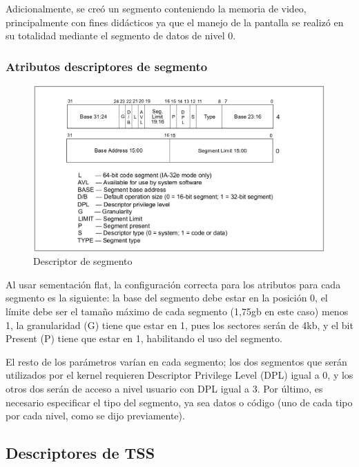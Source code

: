 	Adicionalmente, se creó un segmento conteniendo la memoria de video, principalmente con 
fines didácticos ya que el manejo de la pantalla se realizó en su totalidad mediante el segmento de datos de nivel 0.

\subsubsection{Atributos descriptores de segmento}


\begin{figure}[h]
\begin{center}
  \includegraphics[scale=0.3]{secciones/dibujitos/descriptorDeSegmento.png}
\end{center}
\caption{Descriptor de segmento}
\label{fig:descriptorDeSegmento}
\end{figure}

	
	Al usar sementación flat, la configuración correcta para los atributos para cada segmento es la 
siguiente: la base del segmento debe estar en la posición 0, el límite debe ser el tamaño máximo 
de cada segmento (1,75gb en este caso) menos 1, la granularidad (G) tiene que estar en 1, pues los sectores serán de 4kb, y el bit Present (P) tiene que estar en 1, habilitando el uso del segmento.

	El resto de los parámetros varían en cada segmento; los dos segmentos que serán utilizados por el 
kernel requieren Descriptor Privilege Level (DPL) igual a 0, y los otros dos serán de acceso a nivel usuario con DPL igual a 3. Por último, es necesario especificar el tipo del segmento, ya sea datos o código (uno de cada tipo por cada nivel, como se dijo previamente).

\subsection{Descriptores de TSS}

